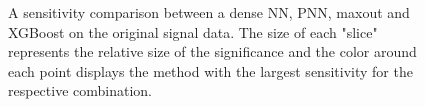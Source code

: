 \begin{figure}
    \caption[A sensitivity comparison between a dense \ac{NN}, \ac{PNN}, maxout and XGBoost on the original 
    signal data.]{A sensitivity comparison between a dense \ac{NN}, \ac{PNN}, maxout and XGBoost on the original 
    signal data. The size of each "slice" represents the relative size of the significance and the color around each 
    point displays the method with the largest sensitivity for the respective combination.}
    \label{fig:GenPlussXGB}
\end{figure}
